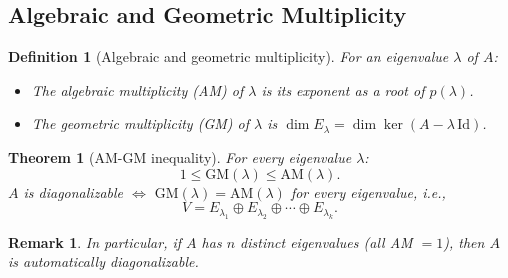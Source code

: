 \documentclass{article}
\newtheorem{theorem}{Theorem}
\newtheorem{definition}{Definition}
\newtheorem{remark}{Remark}
\begin{document}
\subsection{Algebraic and Geometric Multiplicity}
\begin{definition}[Algebraic and geometric multiplicity]
    For an eigenvalue $\lambda$ of $A$:
    \begin{itemize}
        \item The algebraic multiplicity (AM) of $\lambda$ is its exponent as a root of $p(\lambda)$.
        \item The geometric multiplicity (GM) of $\lambda$ is $\dim E_\lambda = \dim\ker(A-\lambda\,\mathrm{Id})$.
    \end{itemize}
\end{definition}
\begin{theorem}[AM-GM inequality]
    For every eigenvalue $\lambda$:
    \[1 \le \mathrm{GM}(\lambda) \le \mathrm{AM}(\lambda).\]
    $A$ is diagonalizable $\iff$ $\mathrm{GM}(\lambda) = \mathrm{AM}(\lambda)$ for every eigenvalue, i.e.,
    \[V = E_{\lambda_1} \oplus E_{\lambda_2} \oplus \cdots \oplus E_{\lambda_k}.\]
\end{theorem}
\begin{remark}
    In particular, if $A$ has $n$ distinct eigenvalues (all AM $= 1$), then $A$ is automatically diagonalizable.
\end{remark}
\end{document}
